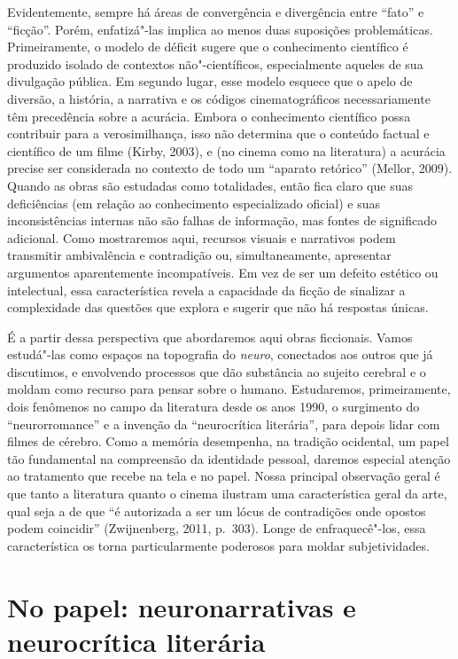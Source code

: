 Evidentemente, sempre há áreas de convergência e divergência entre
``fato'' e ``ficção''. Porém, enfatizá"-las implica ao menos duas
suposições problemáticas. Primeiramente, o modelo de déficit sugere que
o conhecimento científico é produzido isolado de contextos
não"-científicos, especialmente aqueles de sua divulgação pública. Em
segundo lugar, esse modelo esquece que o apelo de diversão, a história,
a narrativa e os códigos cinematográficos necessariamente têm
precedência sobre a acurácia. Embora o conhecimento científico possa
contribuir para a verosimilhança, isso não determina que o conteúdo
factual e científico de um filme (Kirby, 2003), e (no cinema como na
literatura) a acurácia precise ser considerada no contexto de todo um
``aparato retórico'' (Mellor, 2009). Quando as obras são estudadas como
totalidades, então fica claro que suas deficiências (em relação ao
conhecimento especializado oficial) e suas inconsistências internas não
são falhas de informação, mas fontes de significado adicional. Como
mostraremos aqui, recursos visuais e narrativos podem transmitir
ambivalência e contradição ou, simultaneamente, apresentar argumentos
aparentemente incompatíveis. Em vez de ser um defeito estético ou
intelectual, essa característica revela a capacidade da ficção de
sinalizar a complexidade das questões que explora e sugerir que não há
respostas únicas.

É a partir dessa perspectiva que abordaremos aqui obras ficcionais.
Vamos estudá"-las como espaços na topografia do \emph{neuro}, conectados
aos outros que já discutimos, e envolvendo processos que dão substância
ao sujeito cerebral e o moldam como recurso para pensar sobre o humano.
Estudaremos, primeiramente, dois fenômenos no campo da literatura desde
os anos 1990, o surgimento do ``neurorromance'' e a invenção da
``neurocrítica literária'', para depois lidar com filmes de cérebro.
Como a memória desempenha, na tradição ocidental, um papel tão
fundamental na compreensão da identidade pessoal, daremos especial
atenção ao tratamento que recebe na tela e no papel. Nossa principal
observação geral é que tanto a literatura quanto o cinema ilustram uma
característica geral da arte, qual seja a de que ``é autorizada a ser um
lócus de contradições onde opostos podem coincidir'' (Zwijnenberg, 2011,
p.~303). Longe de enfraquecê"-los, essa característica os torna
particularmente poderosos para moldar subjetividades.

\section{No papel: neuronarrativas e neurocrítica literária}

